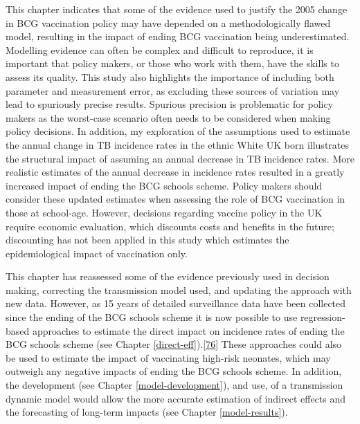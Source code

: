 \documentclass[11pt,twoside]{bristolthesis}
\begin{document}
  This chapter indicates that some of the evidence used to justify the 2005 change in BCG vaccination policy may have depended on a methodologically flawed model, resulting in the impact of ending BCG vaccination being underestimated. Modelling evidence can often be complex and difficult to reproduce, it is important that policy makers, or those who work with them, have the skills to assess its quality. This study also highlights the importance of including both parameter and measurement error, as excluding these sources of variation may lead to spuriously precise results. Spurious precision is problematic for policy makers as the worst-case scenario often needs to be considered when making policy decisions. In addition, my exploration of the assumptions used to estimate the annual change in TB incidence rates in the ethnic White UK born illustrates the structural impact of assuming an annual decrease in TB incidence rates. More realistic estimates of the annual decrease in incidence rates resulted in a greatly increased impact of ending the BCG schools scheme. Policy makers should consider these updated estimates when assessing the role of BCG vaccination in those at school-age. However, decisions regarding vaccine policy in the UK require economic evaluation, which discounts costs and benefits in the future; discounting has not been applied in this study which estimates the epidemiological impact of vaccination only.
  
  This chapter has reassessed some of the evidence previously used in decision making, correcting the transmission model used, and updating the approach with new data. However, as 15 years of detailed surveillance data have been collected since the ending of the BCG schools scheme it is now possible to use regression-based approaches to estimate the direct impact on incidence rates of ending the BCG schools scheme (see Chapter \ref{direct-eff}).{[}\protect\hyperlink{ref-Abbott567511}{76}{]} These approaches could also be used to estimate the impact of vaccinating high-risk neonates, which may outweigh any negative impacts of ending the BCG schools scheme. In addition, the development (see Chapter \ref{model-development}), and use, of a transmission dynamic model would allow the more accurate estimation of indirect effects and the forecasting of long-term impacts (see Chapter \ref{model-results}).
  
  \newpage
  
\end{document}
